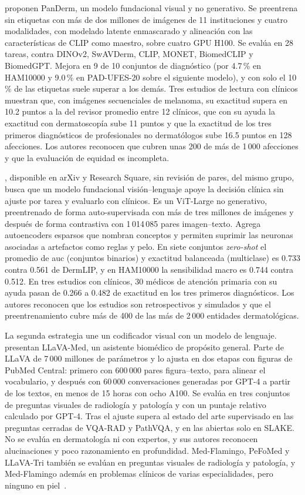 \textcite{yan2025vision} proponen PanDerm, un modelo fundacional visual y no generativo. Se preentrena sin etiquetas
con más de dos millones de imágenes de 11 instituciones y cuatro modalidades, con modelado latente enmascarado y
alineación con las características de CLIP como maestro, sobre cuatro GPU H100. Se evalúa en 28 tareas, contra
DINOv2, SwAVDerm, CLIP, MONET, BiomedCLIP y BiomedGPT. Mejora en 9 de 10 conjuntos de diagnóstico (por 4.7\,\% en
HAM10000 y 9.0\,\% en PAD-UFES-20 sobre el siguiente modelo), y con solo el 10\,\% de las etiquetas suele
superar a los demás. Tres estudios de lectura con clínicos muestran que, con imágenes secuenciales de melanoma, su exactitud supera en
10.2 puntos a la del revisor promedio entre 12 clínicos, que con su ayuda la exactitud con dermatoscopía sube 11
puntos y que la exactitud de los tres primeros diagnósticos de profesionales no dermatólogos sube 16.5 puntos en 128
afecciones. Los autores reconocen que cubren unas 200 de más de 1\,000
afecciones y que la evaluación de equidad es incompleta.

\textcite{yan2026dermfmzero}, disponible en arXiv y Research Square, sin revisión de pares, del mismo grupo, busca que un modelo
fundacional visión--lenguaje apoye la decisión clínica sin ajuste por tarea y evaluarlo con clínicos. Es un
ViT-Large no generativo, preentrenado de forma auto-supervisada con más de tres millones de imágenes y después de
forma contrastiva con 1\,014\,085 pares imagen--texto. Agrega autoencoders esparsos que nombran conceptos y permiten
suprimir las neuronas asociadas a artefactos como reglas y pelo. En siete conjuntos \emph{zero-shot} el promedio de
\gls{auc} (conjuntos binarios) y exactitud balanceada (multiclase) es 0.733 contra 0.561 de DermLIP, y en HAM10000 la sensibilidad macro es 0.744 contra 0.512. En tres estudios con
clínicos, 30 médicos de atención primaria con su ayuda pasan de 0.266 a 0.482 de exactitud en los tres primeros
diagnósticos. Los autores reconocen que los estudios son retrospectivos y simulados y que el preentrenamiento cubre
más de 400 de las más de 2\,000 entidades dermatológicas.

La segunda estrategia une un codificador visual con un modelo de lenguaje. \textcite{li2023llavamed} presentan
LLaVA-Med, un asistente biomédico de propósito general. Parte de LLaVA de 7\,000 millones de parámetros y lo ajusta
en dos etapas con figuras de PubMed Central: primero con 600\,000 pares figura--texto, para alinear el vocabulario,
y después con 60\,000 conversaciones generadas por GPT-4 a partir de los textos, en menos de 15 horas con ocho A100. Se evalúa en tres
conjuntos de preguntas visuales de radiología y patología y con un puntaje relativo calculado por GPT-4. Tras el ajuste
supera al estado del arte supervisado en las preguntas cerradas de VQA-RAD y PathVQA, y en las abiertas solo en SLAKE.
No se evalúa en dermatología ni con expertos, y sus autores reconocen alucinaciones y poco razonamiento en profundidad.
Med-Flamingo, PeFoMed y LLaVA-Tri también se evalúan en preguntas visuales de radiología y patología, y
Med-Flamingo además en problemas clínicos de varias especialidades, pero ninguno en
piel~\cite{moor2023medflamingo,he2025pefomed,xie2025medtrinity25m}.

